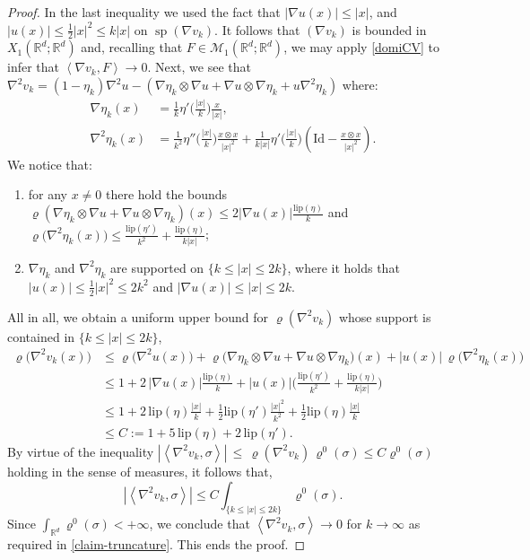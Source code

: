\documentclass[11pt,letterpaper,reqno]{amsart}
\theoremstyle{definition}
\numberwithin{equation}{section}
\newcommand{\R}{\mathbb{R}}
\newcommand{\Rd}{\R^d}
\newcommand{\Mes}{{\mathcal{M}}}
\newcommand{\pairing}[1]{{\left \langle #1 \right \rangle}}
\newcommand{\abs}[1]{{\left \lvert #1 \right \rvert}}
\newcommand{\Lip}{{\mathrm{lip}}}
\DeclareMathOperator{\spt}{sp}
\begin{document}
{\begin{proof}
In the last inequality we used the fact that $|\nabla u(x)| \le |x|$, and  $  |u(x)| \le \frac1{2} |x|^2 \le k |x| $
on $\spt (\nabla v_k)$. 
It follows that  $(\nabla v_k)$ is bounded in $X_1(\R^d;\Rd)$ and, recalling that  $F\in \Mes_1(\R^d;\R^d)$, we may apply 
\eqref{domiCV} to infer that $\pairing{\nabla v_k,F} \to 0$.
Next,  we see that\  $\nabla^2 v_k= (1-\eta_k) \nabla^2 u  - (\nabla \eta_k \otimes \nabla u +\nabla u\otimes \nabla \eta_k
+ u  \nabla^2 \eta_k)$ where:
\begin{align*}
	\nabla  \eta_k (x) &=  \frac1{k} \eta'\Big(\frac{|x|}{k}\Big) \frac{x}{|x|},\\
	 \nabla^2 \eta_k(x) &=\frac1{k^2} \eta''\Big(\frac{|x|}{k}\Big) \frac{x\otimes x}{|x|^2} + \frac1{k|x|} \eta' \Big(\frac{|x|}{k}\Big)\left( \mathrm{Id} - \frac{x\otimes x}{|x|^2}\right).
\end{align*}
 We notice  that:
 \begin{enumerate}
\item[-] for any $x \neq 0$ there hold the bounds $\varrho(\nabla \eta_k \otimes \nabla u +\nabla u\otimes \nabla \eta_k)(x) \le 2|\nabla u(x)|\frac{\Lip(\eta)}{k}$ and $\varrho\big(\nabla^2 \eta_k(x)\big) \leq \frac{\Lip(\eta')}{k^2} + \frac{\Lip(\eta)}{k \abs{x}}$;


\item[-] $\nabla \eta_k$ and $\nabla^2 \eta_k$ are supported on $\{ k\le |x|\le 2k\}$, where it holds that $|u(x)|\le \frac1{2} |x|^2\le 2 k^2$ and $|\nabla u(x)|\le  |x|\le 2 k$.
\end{enumerate}
All in all,  we obtain a uniform upper bound for $\varrho(\nabla^2 v_k)$ whose support is contained  in $\{k\le |x| \le 2k\}$,
\begin{align*} \varrho\big(\nabla^2 v_k(x)\big) &\le  \varrho\big(\nabla^2u(x)\big)  + \varrho\big(\nabla \eta_k \otimes \nabla u +\nabla u\otimes \nabla \eta_k\big)(x)
+ |u(x)|\, \varrho\big(\nabla^2 \eta_k(x)\big) \\
&\le 1 +  2\,|\nabla u(x)|\frac{\Lip(\eta)}{k} + |u(x)| \Big( \frac{\Lip(\eta')}{k^2} + \frac{\Lip(\eta)}{k \abs{x}} \Big)\\
& \le 1 +  2 \,\Lip(\eta) \frac{|x|}{k} + \frac1{2} \Lip(\eta') \frac {|x|^2}{k^2} + \frac1{2} \Lip(\eta) \frac {|x|}{k} \\
&\le C:=1 + 5 \, \Lip(\eta) + 2 \,\Lip(\eta').
\end{align*} 
By virtue of the  inequality  $|\pairing{\nabla^2 v_k,\sigma}|\, \le\,  \varrho(\nabla^2 v_k)\, \varrho^0(\sigma) \le C  \varrho^0(\sigma) $ 
holding in  the sense of measures,
it follows that,
$$  |\pairing{\nabla^2 v_k,\sigma}|  \le  C \int_{\{k\le |x| \le 2k\}}  \varrho^0(\sigma) .
$$
Since $\int_{\R^d} \varrho^0(\sigma)<+\infty$, we conclude that $\pairing{\nabla^2 v_k,\sigma}\to 0$ for $k\to\infty$
as required in \eqref{claim-truncature}.
This ends the proof.
\end{proof}


}
\end{document}
